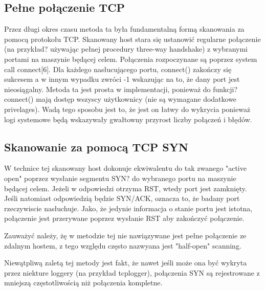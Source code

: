 \subsection{Pełne połączenie TCP}

Przez długi okres czasu metoda ta była fundamentalną formą skanowania za pomocą protokołu TCP. Skanowany host stara się ustanowić regularne połączenie (na przykład? używając pełnej procedury three-way handshake) z wybranymi portami na maszynie będącej celem. Połączenia rozpoczynane są poprzez system call connect[6]. Dla każdego nasłucującego portu, connect() zakończy się sukcesem a w innym wypadku zwróci -1 wskazując na to, że dany port jest nieosiągalny. Metoda ta jest prosta w implementacji, ponieważ do funkcji? connect() mają dostęp wszyscy użytkownicy (nie są wymagane dodatkowe privelages).
Wadą tego sposobu jest to, że jest on łatwy do wykrycia ponieważ logi systemowe będą wskazywały gwałtowny przyrost liczby połączeń i błędów. 



\subsection{Skanowanie za pomocą TCP SYN}

W technice tej skanowany host dokonuje ekwiwalentu do tak zwanego "active open" poprzez wysłanie segmentu SYN? do wybranego portu na maszynie będącej celem. Jeżeli w odpowiedzi otrzyma RST, %
wtedy port jest zamknięty. Jeśli natomiast odpowiedzią będzie SYN/ACK, oznacza to, że badany port rzeczywiscie nasłuchuje. Jako, że jedynie informacja o stanie portu jest istotna, połączenie jest przerywane poprzez wysłanie RST aby zakończyć połączenie.

Zauważyć należy, żę w metodzie tej nie nawiązywane jest pełne połączenie ze zdalnym hostem, z tego względu często nazwyana jest "half-open" scanning.

Niewątpliwą zaletą tej metody jest fakt, że nawet jeśli może ona być wykryta przez niekture loggery (na przykład tcplogger), połączenia SYN są rejestrowane z mniejszą częstotliwością niż połączenia kompletne.

